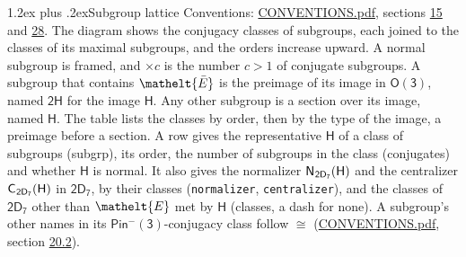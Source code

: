 \documentclass[10pt,a4paper]{article}
\makeatletter
\renewcommand\section{\@startsection{section}{1}{\z@}{-3ex plus -1ex minus -.2ex}%
  {1.2ex plus .2ex}{\normalfont\large\sffamily\bfseries\color{parttitle}}}
\numberwithin{equation}{section}
\newcommand{\eltfont}[1]{{\let\sigma\eltsigma\mathelt{#1}}}
\newcommand{\grp}[1]{\mathsf{#1}}
\newcommand{\cls}[1]{\eltfont{#1}}
\newcommand{\elt}[1]{\eltfont{#1}}
\newcommand{\samecls}{\cong}
\newcommand{\nconj}[1]{{\scriptsize$\times#1$}}
\newcommand{\barred}[1]{\bar{#1}}
\newcommand{\hairsp}{\mkern1mu}
\makeatother
\begin{document}
\section{Subgroup lattice}\label{s:subgroups}
Conventions: \href{../../CONVENTIONS.pdf}{CONVENTIONS.pdf}, sections \href{../../../rotation/CONVENTIONS.pdf\#conv.15}{15} and \href{../../CONVENTIONS.pdf\#conv.28}{28}.
The diagram shows the conjugacy classes of subgroups, each joined to the classes of its maximal subgroups, and the orders increase upward. A normal subgroup is framed, and ${\times}c$ is the number $c > 1$ of conjugate subgroups. \label{n:group.H}A subgroup that contains $\elt{\barred{E}}$ is the preimage of its image in $\grp{O(3)}$, named $\grp{2H}$ for the image $\grp{H}$. Any other subgroup is a section over its image, named $\grp{H}$. The table lists the classes by order, then by the type of the image, a preimage before a section. \label{n:head.subgroup}\label{n:head.order}\label{n:head.conjugates}\label{n:head.normal}A row gives the representative $\grp{H}$ of a class of subgroups (subgrp), its order, the number of subgroups in the class (conjugates) and whether $\grp{H}$ is normal. \label{n:group.normalizer}\label{n:group.centralizer}\label{n:head.classes}It also gives the normalizer $\grp{N}_{\hairsp \grp{2D_{7}}}(\grp{H})$ and the centralizer $\grp{C}_{\hairsp \grp{2D_{7}}}(\grp{H})$ in $\grp{2D_{7}}$, by their classes (\texttt{normalizer}, \texttt{centralizer}), and the classes of $\grp{2D_{7}}$ other than $\cls{E}$ met by $\grp{H}$ (classes, a dash for none). A subgroup's other names in its \href{Pinminus3.pdf}{$\grp{Pin^{-}(3)}$}-conjugacy class follow $\samecls$ (\href{../../CONVENTIONS.pdf}{CONVENTIONS.pdf}, section \href{../../CONVENTIONS.pdf\#conv.20.2}{20.2}).
\begin{center}
\end{center}
\end{document}
